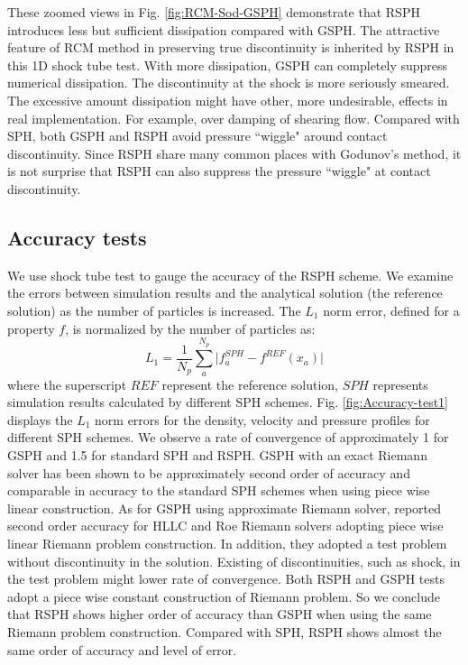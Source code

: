 These zoomed views in Fig. \ref{fig:RCM-Sod-GSPH} demonstrate that RSPH introduces less but sufficient dissipation compared with GSPH. The attractive feature of RCM method in preserving true discontinuity is inherited by RSPH in this 1D shock tube test. With more dissipation, GSPH can completely suppress numerical dissipation. The discontinuity at the shock is more seriously smeared. The excessive amount dissipation might have other, more undesirable, effects in real implementation. For example, over damping of shearing flow. Compared with SPH, both GSPH and RSPH avoid pressure ``wiggle" around contact discontinuity. Since RSPH share many common places with Godunov's method, it is not surprise that RSPH can also suppress the pressure ``wiggle" at contact discontinuity.

\subsection{Accuracy tests}
We use shock tube test to gauge the accuracy of the RSPH scheme.
We examine the errors between simulation results and the analytical solution (the reference solution) as the number of particles is increased. The $L_1$ norm error, defined for a property $f$, is normalized by the number of particles as:
\begin{equation}
L_1= \frac{1}{N_p} \sum_a^{N_p} \vert f_a^{SPH} - f^{REF} (x_a) \vert 
\end{equation}
where the superscript $REF$ represent the reference solution, $SPH$ represents simulation results calculated by different SPH schemes. Fig. \ref{fig:Accuracy-test1} displays the $L_1$ norm errors for the density, velocity and pressure profiles for different SPH schemes.
We observe a rate of convergence of approximately 1 for GSPH and 1.5 for standard SPH and RSPH.
GSPH with an exact Riemann solver has been shown to be approximately second order of accuracy \citep{puri2014comparison} and comparable in accuracy to the standard SPH schemes when using piece wise linear construction. As for GSPH using approximate Riemann solver, \citet{puri2014approximate} reported second order accuracy for HLLC and Roe Riemann solvers adopting piece wise linear Riemann problem construction. In addition, they adopted a test problem without discontinuity in the solution. Existing of discontinuities, such as shock, in the test problem might lower rate of convergence. Both RSPH and GSPH tests adopt a piece wise constant construction of Riemann problem. So we conclude that RSPH shows higher order of accuracy than GSPH when using the same Riemann problem construction. Compared with SPH, RSPH shows almost the same order of accuracy and level of error.

